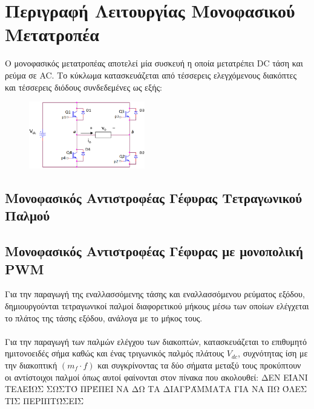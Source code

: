 \section{Περιγραφή Λειτουργίας Μονοφασικού Μετατροπέα}

\noindent
Ο μονοφασικός μετατροπέας αποτελεί μία συσκευή η οποία μετατρέπει DC τάση και ρεύμα σε AC. Το κύκλωμα κατασκευάζεται από τέσσερεις ελεγχόμενους διακόπτες και τέσσερεις διόδους συνδεδεμένες ως εξής:
\begin{figure}[H]
	\centering
	\includegraphics[width=0.45\textwidth]{Images/circuit1.png}
	\label{circuit_1}
\end{figure}

\subsection{Μονοφασικός Αντιστροφέας Γέφυρας Τετραγωνικού Παλμού}
\subsection{Μονοφασικός Αντιστροφέας Γέφυρας με μονοπολική PWM}
\noindent
Για την παραγωγή της εναλλασσόμενης τάσης και εναλλασσόμενου ρεύματος εξόδου, δημιουργούνται τετραγωνικοί παλμοί διαφορετικού μήκους μέσω των οποίων ελέγχεται το πλάτος της τάσης εξόδου, ανάλογα με το μήκος τους.
\noindent\\\\
Για την παραγωγή των παλμών ελέγχου των διακοπτών, κατασκευάζεται το επιθυμητό ημιτονοειδές σήμα καθώς και ένας τριγωνικός παλμός πλάτους $V_{dc}$, συχνότητας ίση με την διακοπτική $(m_f \cdot f)$ και συγκρίνοντας τα δύο σήματα μεταξύ τους προκύπτουν οι αντίστοιχοι παλμοί όπως αυτοί φαίνονται στον πίνακα που ακολουθεί: ΔΕΝ ΕΊΑΝΙ ΤΕΛΕΊΩΣ ΣΩΣΤΌ ΠΡΈΠΕΙ ΝΑ ΔΩ ΤΑ ΔΙΑΓΡΆΜΜΑΤΑ ΓΙΑ ΝΑ ΠΩ ΌΛΕΣ ΤΙΣ ΠΕΡΙΠΤΏΣΕΙΣ